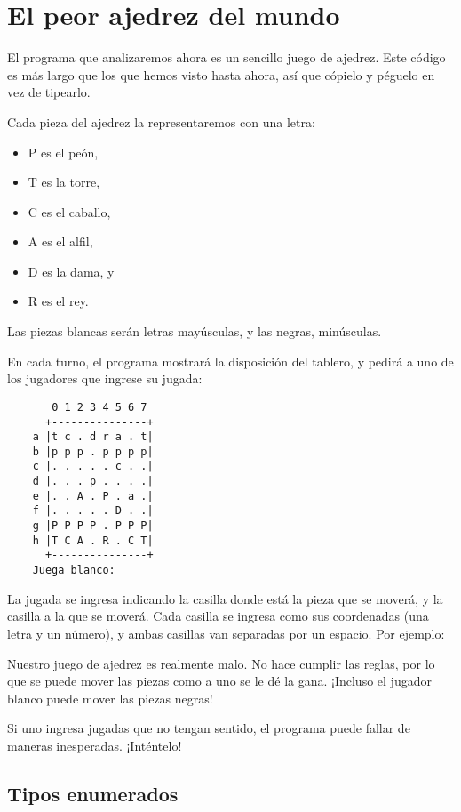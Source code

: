 \chapter{El peor ajedrez del mundo}

El programa que analizaremos ahora es un sencillo juego de ajedrez. Este
código es más largo que los que hemos visto hasta ahora, así que cópielo
y péguelo en vez de tipearlo.

Cada pieza del ajedrez la representaremos con una letra:

\begin{itemize}
\item
  P es el peón,
\item
  T es la torre,
\item
  C es el caballo,
\item
  A es el alfil,
\item
  D es la dama, y
\item
  R es el rey.
\end{itemize}

Las piezas blancas serán letras mayúsculas, y las negras, minúsculas.

En cada turno, el programa mostrará la disposición del tablero, y pedirá
a uno de los jugadores que ingrese su jugada:

\begin{verbatim}
       0 1 2 3 4 5 6 7
      +---------------+
    a |t c . d r a . t|
    b |p p p . p p p p|
    c |. . . . . c . .|
    d |. . . p . . . .|
    e |. . A . P . a .|
    f |. . . . . D . .|
    g |P P P P . P P P|
    h |T C A . R . C T|
      +---------------+
    Juega blanco: 

\end{verbatim}

La jugada se ingresa indicando la casilla donde está la pieza que se
moverá, y la casilla a la que se moverá. Cada casilla se ingresa como
sus coordenadas (una letra y un número), y ambas casillas van separadas
por un espacio. Por ejemplo:

Nuestro juego de ajedrez es realmente malo. No hace cumplir las reglas,
por lo que se puede mover las piezas como a uno se le dé la gana.
¡Incluso el jugador blanco puede mover las piezas negras!

Si uno ingresa jugadas que no tengan sentido, el programa puede fallar
de maneras inesperadas. ¡Inténtelo!

\section{Tipos enumerados}

